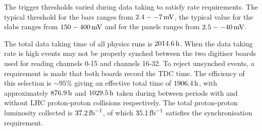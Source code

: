 \documentclass[12pt]{article}
\newcommand{\unit}[1]{\ensuremath{\text{\,#1}}\xspace}
\newcommand{\fbinv} {\mbox{\ensuremath{\,\text{fb}^{-1}}}\xspace}
\begin{document}
The trigger thresholds varied during data taking to satisfy rate requirements. The typical 
threshold for the bars ranges from $2.4--7\unit{mV}$, the typical value for the slabs ranges from $150-400\unit{mV}$ and 
for the panels ranges from $2.5--40\unit{mV}$.

The total data taking time of all physics runs is $2014.6\unit{h}$. When the data taking rate is high
events may not be properly synched between the two digitiser boards used for reading channels 0-15 and 
channels 16-32. To reject unsynched events, a requirement is made that both boards record
the TDC time. The efficiency of this selection is $\sim 95\%$ giving an effective total
time of $1906.4\unit{h}$, with approximately $876.9\unit{h}$ and $1029.5\unit{h}$ 
taken during between periods with and without LHC proton-proton collisions respectively.
The total proton-proton luminosity collected is $37.2\fbinv$, of which $35.1\fbinv$ 
satisfies the synchronisation requirement. 
\end{document}
